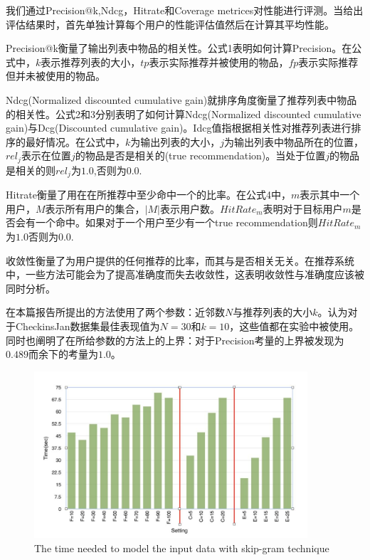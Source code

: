 \documentclass[UTF8]{ctexart}
\begin{document}
	我们通过Precision@k,Ndcg，Hitrate和Coverage metrices对性能进行评测。当给出评估结果时，首先单独计算每个用户的性能评估值然后在计算其平均性能。
	
	Precision@k衡量了输出列表中物品的相关性。公式1表明如何计算Precision。在公式中，$k$表示推荐列表的大小，$tp$表示实际推荐并被使用的物品，$fp$表示实际推荐但并未被使用的物品。
	
	Ndcg(Normalized discounted cumulative gain)就排序角度衡量了推荐列表中物品的相关性。公式2和3分别表明了如何计算Ndcg(Normalized discounted cumulative gain)与Dcg(Discounted cumulative gain)。Idcg值指根据相关性对推荐列表进行排序的最好情况。在公式中，$k$为输出列表的大小，$j$为输出列表中物品所在的位置，$rel_j$表示在位置$j$的物品是否是相关的(true recommendation)。当处于位置$j$的物品是相关的则$rel_j$为$1.0$,否则为$0.0$.
	
	Hitrate衡量了用在在所推荐中至少命中一个的比率。在公式4中，$m$表示其中一个用户，$M$表示所有用户的集合，$|M|$表示用户数。$HitRate_m$表明对于目标用户$m$是否会有一个命中。如果对于一个用户至少有一个true recommendation则$HitRate_m$为$1.0$否则为$0.0$.
	
	收敛性衡量了为用户提供的任何推荐的比率，而其与是否相关无关。在推荐系统中，一些方法可能会为了提高准确度而失去收敛性\cite{bellogin2013empirical,herlocker2004evaluating}，这表明收敛性与准确度应该被同时分析。
	
	在本篇报告所提出的方法使用了两个参数：近邻数$N$与推荐列表的大小$k$。\cite{ozsoy2014multi}认为对于CheckinsJan数据集最佳表现值为$N=30$和$k=10$，这些值都在实验中被使用。同时\cite{ozsoy2014multi}也阐明了在所给参数的方法上的上界：对于Precision考量的上界被发现为$0.489$而余下的考量为$1.0$。
	\begin{figure}
		\begin{center}
			\includegraphics[width=4in]{2}
		\end{center}
		\caption{The time needed to model the input data with skip-gram technique}
	\end{figure}
	
\end{document}

